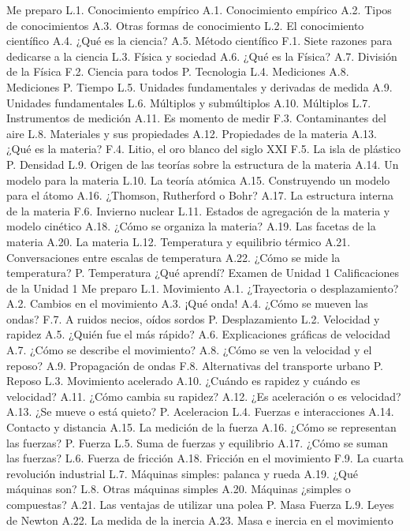 Me preparo
L.1. Conocimiento empírico
A.1. Conocimiento empírico
A.2. Tipos de conocimientos
A.3. Otras formas de conocimiento
L.2. El conocimiento científico
A.4. ¿Qué es la ciencia?
A.5. Método científico
F.1. Siete razones para dedicarse a la ciencia
L.3. Física y sociedad
A.6. ¿Qué es la Física?
A.7. División de la Física
F.2. Ciencia para todos
P. Tecnologia
L.4. Mediciones
A.8. Mediciones
P. Tiempo
L.5. Unidades fundamentales y derivadas de medida
A.9. Unidades fundamentales
L.6. Múltiplos y submúltiplos
A.10. Múltiplos
L.7. Instrumentos de medición
A.11. Es momento de medir
F.3. Contaminantes del aire
L.8. Materiales y sus propiedades
A.12. Propiedades de la materia
A.13. ¿Qué es la materia?
F.4. Litio, el oro blanco del siglo XXI
F.5. La isla de plástico
P. Densidad
L.9. Origen de las teorías sobre la estructura de la materia
A.14. Un modelo para la materia
L.10. La teoría atómica
A.15. Construyendo un modelo para el átomo
A.16. ¿Thomson, Rutherford o Bohr?
A.17. La estructura interna de la materia
F.6. Invierno nuclear
L.11. Estados de agregación de la materia y modelo cinético
A.18. ¿Cómo se organiza la materia?
A.19. Las facetas de la materia
A.20. La materia
L.12. Temperatura y equilibrio térmico
A.21. Conversaciones entre escalas de temperatura
A.22. ¿Cómo se mide la temperatura?
P. Temperatura
¿Qué aprendí?
Examen de Unidad 1
Calificaciones de la Unidad 1
Me preparo
L.1. Movimiento
A.1. ¿Trayectoria o desplazamiento?
A.2. Cambios en el movimiento
A.3. ¡Qué onda!
A.4. ¿Cómo se mueven las ondas?
F.7. A ruidos necios, oídos sordos
P. Desplazamiento
L.2. Velocidad y rapidez
A.5. ¿Quién fue el más rápido?
A.6. Explicaciones gráficas de velocidad
A.7. ¿Cómo se describe el movimiento?
A.8. ¿Cómo se ven la velocidad y el reposo?
A.9. Propagación de ondas
F.8. Alternativas del transporte urbano
P. Reposo
L.3. Movimiento acelerado
A.10. ¿Cuándo es rapidez y cuándo es velocidad?
A.11. ¿Cómo cambia su rapidez?
A.12. ¿Es aceleración o es velocidad?
A.13. ¿Se mueve o está quieto?
P. Aceleracion
L.4. Fuerzas e interacciones
A.14. Contacto y distancia
A.15. La medición de la fuerza
A.16. ¿Cómo se representan las fuerzas?
P. Fuerza
L.5. Suma de fuerzas y equilibrio
A.17. ¿Cómo se suman las fuerzas?
L.6. Fuerza de fricción
A.18. Fricción en el movimiento
F.9. La cuarta revolución industrial
L.7. Máquinas simples: palanca y rueda
A.19. ¿Qué máquinas son?
L.8. Otras máquinas simples
A.20. Máquinas ¿simples o compuestas?
A.21. Las ventajas de utilizar una polea
P. Masa Fuerza
L.9. Leyes de Newton
A.22. La medida de la inercia
A.23. Masa e inercia en el movimiento
